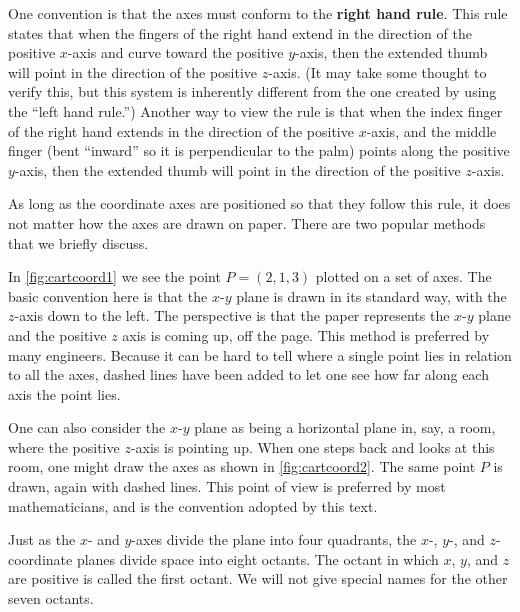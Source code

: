 One convention is that the axes must conform to the \textbf{right hand rule}. This rule states that when the fingers of the right hand extend in the direction of the positive $x$-axis and curve toward the positive $y$-axis, then the extended thumb will point in the direction of the positive $z$-axis. (It may take some thought to verify this, but this system is inherently different from the one created by using the ``left hand rule.'')
Another way to view the rule is that when the index finger of the right hand extends in the direction of the positive $x$-axis, and the middle finger (bent ``inward'' so it is perpendicular to the palm) points along the positive $y$-axis, then the extended thumb will point in the direction of the positive $z$-axis.%

As long as the coordinate axes are positioned so that they follow this rule, it does not matter how the axes are drawn on paper. There are two popular methods that we briefly discuss.


In \autoref{fig:cartcoord1} we see the point $P=(2,1,3)$ plotted on a set of axes. The basic convention here is that the $x$-$y$ plane is drawn in its standard way, with the $z$-axis down to the left. The perspective  is that the paper represents the $x$-$y$ plane and the positive $z$ axis is coming up, off the page. This method is preferred by many engineers. Because it can be hard to tell where a single point lies in relation to all the axes, dashed lines have been added to let one see how far along each axis the point lies.

One can also consider the $x$-$y$ plane as being a horizontal plane in, say, a room, where the positive $z$-axis is pointing up. When one steps back and looks at this room, one might draw the axes as shown in \autoref{fig:cartcoord2}. The same point $P$ is drawn, again with dashed lines. This point of view is preferred by most mathematicians, and is the convention adopted by this text.

Just as the $x$- and $y$-axes divide the plane into four quadrants, the $x$-, $y$-, and $z$-coordinate planes divide space into eight octants.  The octant in which $x$, $y$, and $z$ are positive is called the first octant.  We will not give special names for the other seven octants.

